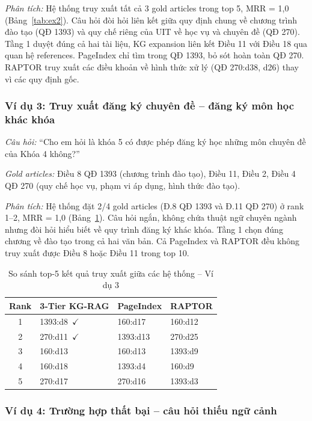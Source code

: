 \textit{Phân tích:} Hệ thống truy xuất tất cả 3 gold articles trong top 5, MRR = 1,0
(Bảng~\ref{tab:ex2}). Câu hỏi đòi hỏi liên kết giữa quy định chung về chương trình
đào tạo (QĐ 1393) và quy chế riêng của UIT về học vụ và chuyên đề (QĐ 270). Tầng 1
duyệt đúng cả hai tài liệu, KG expansion liên kết Điều 11 với Điều 18 qua quan hệ
references. PageIndex chỉ tìm trong QĐ 1393, bỏ sót hoàn toàn QĐ 270. RAPTOR truy
xuất các điều khoản về hình thức xử lý (QĐ 270:d38, d26) thay vì các quy định gốc.

\subsubsection*{Ví dụ 3: Truy xuất đăng ký chuyên đề -- đăng ký môn học khác khóa}

\textit{Câu hỏi:} ``Cho em hỏi là khóa 5 có được phép đăng ký học những môn chuyên đề
của Khóa 4 không?''

\textit{Gold articles:} Điều 8 QĐ 1393 (chương trình đào tạo), Điều 11, Điều 2, Điều 4
QĐ 270 (quy chế học vụ, phạm vi áp dụng, hình thức đào tạo).

\textit{Phân tích:} Hệ thống đặt 2/4 gold articles (Đ.8 QĐ 1393 và Đ.11 QĐ 270) ở
rank 1--2, MRR = 1,0 (Bảng~\ref{tab:ex3}). Câu hỏi ngắn, không chứa thuật ngữ
chuyên ngành nhưng đòi hỏi hiểu biết về quy trình đăng ký khác khóa. Tầng 1 chọn
đúng chương về đào tạo trong cả hai văn bản. Cả PageIndex và RAPTOR đều không truy
xuất được Điều 8 hoặc Điều 11 trong top 10.

\begin{table}[htbp]
  \centering
  \caption{So sánh top-5 kết quả truy xuất giữa các hệ thống -- Ví dụ 3}
  \label{tab:ex3}
  \begin{tabular}{clll}
    \toprule
    \textbf{Rank} & \textbf{3-Tier KG-RAG} & \textbf{PageIndex} & \textbf{RAPTOR} \\
    \midrule
    1 & 1393:d8~$\checkmark$  & 160:d17   & 160:d12  \\
    2 & 270:d11~$\checkmark$  & 1393:d13  & 270:d25  \\
    3 & 160:d13             & 160:d13   & 1393:d9  \\
    4 & 160:d18             & 1393:d4   & 160:d9   \\
    5 & 270:d17             & 270:d16   & 1393:d3  \\
    \bottomrule
  \end{tabular}
\end{table}

\subsubsection*{Ví dụ 4: Trường hợp thất bại -- câu hỏi thiếu ngữ cảnh}

